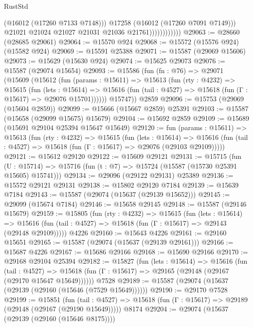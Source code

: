 \begin{lexlean}{RustStd}
\begin{coremodule}
                                (@16012 (@17260 @7133 @7148)))
                              @17258
                              (@16012 (@17260 @7091 @7149)))
                            @21021
                            @21024
                            @21027
                            @21031
                            @21036
                            @21761))))))))))))
@29063 := @28660 (@28685 @29061)
@29064 := @15570 @924
@29068 := @15572 (@15576 @924) (@15582 @924)
@29069 := @15591 @25388
@29071 := @15587 (@29069 @15606)
@29073 := @15629 (@15630 @924)
@29074 := @15625 @29073
@29076 := @15587 (@29074 @15654)
@29093 := @15586
    (fun (fn : @76) =>
    @29071
      (@15609
        (@15612
          (fun (params : @15611) =>
          @15613
            (fun (rty : @4232) =>
            @15615
              (fun (lets : @15614) =>
              @15616 (fun (tail : @4527) => @15618 (fun (Γ : @15617) => @29076 @15701))))))
        @15747))
    @2859
@29096 := @15753 (@29069 (@15604 @2859))
@29099 := @15666 (@15667 @2859) @25391
@29103 := @15587 (@15658 (@29099 @15675) @15679)
@29104 := @15692 @2859
@29109 := @15689 (@15691 @29104 @25394 @15647 @15649)
@29120 := fun (params : @15611) =>
  @15613
    (fun (rty : @4232) =>
    @15615
      (fun (lets : @15614) =>
      @15616 (fun (tail : @4527) => @15618 (fun (Γ : @15617) => @29076 (@29103 @29109)))))
@29121 := @15612 @29120
@29122 := @15609 @29121
@29131 := @15715
    (fun (U : @15714) => @15716 (fun (t : @7) => @15724 (@15587 (@15730 @25391 @15605) @15741)))
@29134 := @29096 (@29122 @29131) @25389
@29136 := @15572 @29121 @29131
@29138 := @15802 @29120 @7184
@29139 := @15639 @7184
@29143 := @15587 (@29074 (@15637 (@29139 @15652)))
@29145 := @29099 (@15674 @7184)
@29146 := @15658 @29145
@29148 := @15587 (@29146 @15679)
@29159 := @15805
    (fun (rty : @4232) =>
    @15615
      (fun (lets : @15614) =>
      @15616 (fun (tail : @4527) => @15618 (fun (Γ : @15617) => @29143 (@29148 @29109)))))
    @4226
@29160 := @15643 @4226
@29161 := @29160 @15651
@29165 := @15587 (@29074 (@15637 (@29139 @29161)))
@29166 := @15687 @4226
@29167 := @15686 @29166
@29168 := @15690 @29166
@29170 := @29168 @29104 @25394
@29182 := @15827
    (fun (lets : @15614) =>
    @15616
      (fun (tail : @4527) =>
      @15618 (fun (Γ : @15617) => @29165 (@29148 (@29167 (@29170 @15647 @15649))))))
    @7528
@29189 := @15587 (@29074 (@15637 (@29139 (@29160 (@15646 (@7529 @15649))))))
@29190 := @29170 @7528
@29199 := @15851
    (fun (tail : @4527) => @15618 (fun (Γ : @15617) => @29189 (@29148 (@29167 (@29190 @15649)))))
    @8174
@29204 := @29074 (@15637 (@29139 (@29160 (@15646 @8175))))

\end{coremodule}
\end{lexlean}
